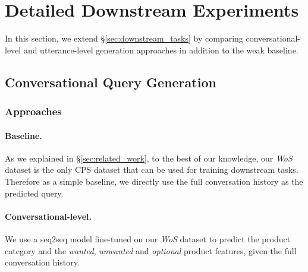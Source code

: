 
\section{Detailed Downstream Experiments}
\label{sec:detailed_downstream_tasks}
In this section, we extend \S\ref{sec:downstream_tasks} by comparing conversational-level and utterance-level generation approaches in addition to the weak baseline.

\subsection{Conversational Query Generation} \label{sec:detailed_conversational_query_generation}
\subsubsection{Approaches}
\paragraph{Baseline.} As we explained in \S\ref{sec:related_work}, to the best of our knowledge, our \textit{WoS} dataset is the only CPS dataset that can be used for training downstream tasks. Therefore as a simple baseline, we directly use the full conversation history as the predicted query.
\paragraph{Conversational-level.} We use a seq2seq model fine-tuned on our \textit{WoS} dataset to predict the product category and the \textit{wanted}, \textit{unwanted} and \textit{optional} product features, given the full conversation history.
